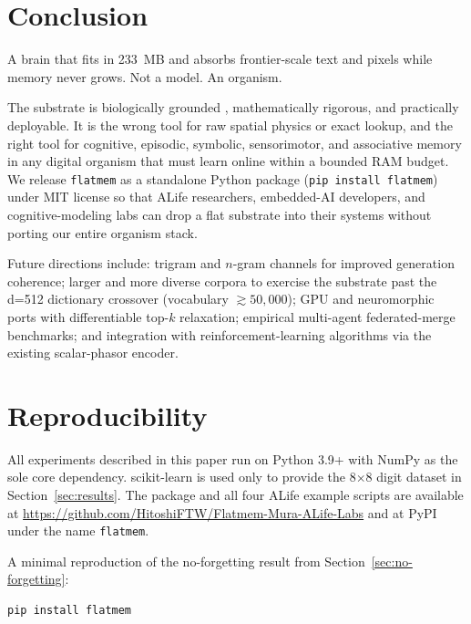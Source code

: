 \documentclass[11pt,a4paper]{article}
\begin{document}
\section{Conclusion}
\label{sec:conclusion}

A brain that fits in 233~MB and absorbs frontier-scale text and pixels
while memory never grows.  Not a model.  An organism.

The substrate is biologically grounded
\cite{kanerva1988sparse,marr1969cerebellum,ito2008control}, mathematically
rigorous, and practically deployable.  It is the wrong tool for raw
spatial physics or exact lookup, and the right tool for cognitive,
episodic, symbolic, sensorimotor, and associative memory in any digital
organism that must learn online within a bounded RAM budget.  We release
\texttt{flatmem} as a standalone Python package
(\texttt{pip install flatmem}) under MIT license so that ALife
researchers, embedded-AI developers, and cognitive-modeling labs can
drop a flat substrate into their systems without porting our entire
organism stack.

Future directions include:  trigram and $n$-gram channels for improved
generation coherence;  larger and more diverse corpora to exercise the
substrate past the d=512 dictionary crossover (vocabulary $\gtrsim 50{,}000$);
GPU and neuromorphic ports
\cite{merolla2014million,davies2018loihi,indiveri2011neuromorphic} with
differentiable top-$k$ relaxation;  empirical multi-agent federated-merge
benchmarks;  and integration with reinforcement-learning algorithms via
the existing scalar-phasor encoder.

\section*{Reproducibility}

All experiments described in this paper run on Python 3.9+ with NumPy
as the sole core dependency.  scikit-learn is used only to provide the
8$\times$8 digit dataset in Section~\ref{sec:results}.  The package and
all four ALife example scripts are available at
\url{https://github.com/HitoshiFTW/Flatmem-Mura-ALife-Labs} and at
PyPI under the name \texttt{flatmem}.

A minimal reproduction of the no-forgetting result from
Section~\ref{sec:no-forgetting}:

\begin{lstlisting}
pip install flatmem
\end{lstlisting}
\end{document}

